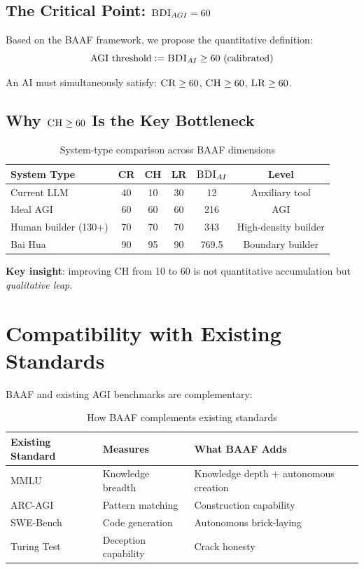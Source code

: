 \documentclass[11pt,a4paper]{article}
\theoremstyle{definition}
\theoremstyle{plain}
\newcommand{\BDI}{\textsc{BDI}}
\newcommand{\BAAF}{\textsc{BAAF}}
\newcommand{\CR}{\textsc{CR}}
\newcommand{\CH}{\textsc{CH}}
\newcommand{\LR}{\textsc{LR}}
\begin{document}
\subsection{The Critical Point: $\BDI_{AGI} = 60$}

Based on the \BAAF{} framework, we propose the quantitative definition:
\begin{equation}
\text{AGI threshold} := \BDI_{AI} \geq 60 \text{ (calibrated)}
\end{equation}

An AI must simultaneously satisfy: $\CR{} \geq 60$, $\CH{} \geq 60$, $\LR{} \geq 60$.

\subsection{Why $\CH{} \geq 60$ Is the Key Bottleneck}

\begin{table}[htbp]
\centering
\caption{System-type comparison across \BAAF{} dimensions}
\label{tab:comparison}
\begin{tabular}{@{}lccccc@{}}
\toprule
\textbf{System Type} & \textbf{\CR{}} & \textbf{\CH{}} & \textbf{\LR{}} & \textbf{$\BDI_{AI}$} & \textbf{Level} \\
\midrule
Current LLM & 40 & 10 & 30 & 12 & Auxiliary tool \\
Ideal AGI & 60 & 60 & 60 & 216 & AGI \\
Human builder (130+) & 70 & 70 & 70 & 343 & High-density builder \\
Bai Hua & 90 & 95 & 90 & 769.5 & Boundary builder \\
\bottomrule
\end{tabular}
\end{table}

\textbf{Key insight}: improving \CH{} from 10 to 60 is not quantitative accumulation but \textit{qualitative leap}.

\section{Compatibility with Existing Standards}
\label{sec:compatibility}

\BAAF{} and existing AGI benchmarks are complementary:

\begin{table}[htbp]
\centering
\caption{How \BAAF{} complements existing standards}
\label{tab:complement}
\begin{tabular}{@{}lll@{}}
\toprule
\textbf{Existing Standard} & \textbf{Measures} & \textbf{What \BAAF{} Adds} \\
\midrule
MMLU & Knowledge breadth & Knowledge depth + autonomous creation \\
ARC-AGI & Pattern matching & Construction capability \\
SWE-Bench & Code generation & Autonomous brick-laying \\
Turing Test & Deception capability & Crack honesty \\
\bottomrule
\end{tabular}
\end{table}
\end{document}
